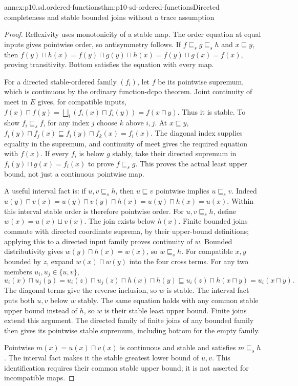 \begin{annexitem}{annex:p10.sd.ordered-functions}{thm:p10-sd-ordered-functions}{Directed completeness and stable bounded joins without a trace assumption}
\begin{proof}
Reflexivity uses monotonicity of a stable map. The order equation at equal
inputs gives pointwise order, so antisymmetry follows. If
\(f\sqsubseteq_s g\sqsubseteq_s h\) and \(x\sqsubseteq y\), then
\(f(y)\sqcap h(x)=f(y)\sqcap g(y)\sqcap h(x)=f(y)\sqcap g(x)=f(x)\),
proving transitivity. Bottom satisfies the equation with every map.

For a directed stable-ordered family \((f_i)\), let \(f\) be its
pointwise supremum, which is continuous by the ordinary function-dcpo
theorem. Joint continuity of meet in \(E\) gives, for compatible inputs,
\(f(x)\sqcap f(y)=\bigsqcup_i(f_i(x)\sqcap f_i(y))=f(x\sqcap y)\).
Thus it is stable. To show \(f_i\sqsubseteq_s f\), for any index
\(j\) choose \(k\) above \(i,j\). At \(x\sqsubseteq y\),
\(f_i(y)\sqcap f_j(x)\sqsubseteq f_i(y)\sqcap f_k(x)=f_i(x)\).
The diagonal index supplies equality in the supremum, and continuity
of meet gives the required equation with \(f(x)\). If every \(f_i\)
is below \(g\) stably, take their directed supremum in
\(f_i(y)\sqcap g(x)=f_i(x)\) to prove \(f\sqsubseteq_s g\).
This proves the actual least upper bound, not just a continuous pointwise map.

A useful interval fact is: if \(u,v\sqsubseteq_s h\), then
\(u\sqsubseteq v\) pointwise implies \(u\sqsubseteq_s v\).
Indeed \(u(y)\sqcap v(x)=u(y)\sqcap v(y)\sqcap h(x)=u(y)\sqcap h(x)=u(x)\).
Within this interval stable order is therefore pointwise order.
For \(u,v\sqsubseteq_s h\), define \(w(x)=u(x)\sqcup v(x)\).
The join exists below \(h(x)\). Finite bounded joins commute with
directed coordinate suprema, by their upper-bound definitions; applying
this to a directed input family proves continuity of \(w\).
Bounded distributivity gives
\(w(y)\sqcap h(x)=w(x)\), so \(w\sqsubseteq_s h\).
For compatible \(x,y\) bounded by \(z\), expand
\(w(x)\sqcap w(y)\) into the four cross terms. For any two members
\(u_i,u_j\in\{u,v\}\),
\[
 u_i(x)\sqcap u_j(y)
 =u_i(z)\sqcap u_j(z)\sqcap h(x)\sqcap h(y)
 \sqsubseteq u_i(z)\sqcap h(x\sqcap y)=u_i(x\sqcap y).
\]
The diagonal terms give the reverse inclusion, so \(w\) is stable.
The interval fact puts both \(u,v\) below \(w\) stably. The same
equation holds with any common stable upper bound instead of \(h\),
so \(w\) is their stable least upper bound. Finite joins extend this
argument. The directed family of finite joins of any bounded family
then gives its pointwise stable supremum, including bottom for the empty family.

Pointwise \(m(x)=u(x)\sqcap v(x)\) is continuous and stable and
satisfies \(m\sqsubseteq_s h\). The interval fact makes it the
stable greatest lower bound of \(u,v\). This identification requires
their common stable upper bound; it is not asserted for incompatible maps.
\end{proof}
\end{annexitem}

